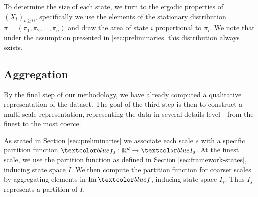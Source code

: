To determine the size of each state, we turn to the ergodic properties of $(X_t)_{t \ge 0}$, specifically
we use the elements of the stationary distribution $\pi = (\pi_1, \pi_2, ..., \pi_n)$ and draw the area of
state $i$ proportional to $\pi_i$. We note that under the assumption presented in \ref{sec:preliminaries}
this distribution always exists.

\subsection{Aggregation}
\label{sec:framework-aggregation}

By the final step of our methodology, we have already computed a qualitative representation of the
dataset. The goal of the third step is then to construct a multi-scale representation, representing
the data in several details level - from the finest to the most coerce.

As stated in Section \ref{sec:preliminaries} we associate each scale $s$ with a specific partition
function $\lstopar{f_s}: \mathbb{R}^d \rightarrow \lstopar{I_s}$. At the finest scale, we use the 
partition function  as defined in Section \ref{sec:framework-states}, inducing state space $I$. We then compute the partition
function for coarser scales by aggregating elements in $\Ima \lstopar{f}$, inducing state space $I_s$.
Thus $I_s$ represents a partition of $I$.

\newpage

